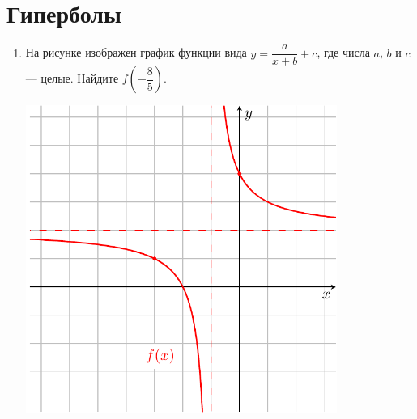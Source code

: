 \documentclass[10pt, a4paper]{article}
\begin{document}
\section{Гиперболы}
\begin{enumerate}
	\item 
	\begin{minipage}[t][8cm][t]{0.5\textwidth}
		На рисунке изображен график функции вида $y=\dfrac{a}{x+b}+c$, где числа $a$, $b$ и $c$ — целые. Найдите $f\left(-\dfrac{8}{5}\right)$.
		\begin{flushright}
		\end{flushright}
	\end{minipage}
	\begin{minipage}[t][8cm][t]{0.5\textwidth}
		\hspace{10pt}
		\includegraphics[align=t, width=0.8\textwidth]{graphs/graph_2/graph_2}
	\end{minipage}
	
\end{enumerate}
\end{document}
